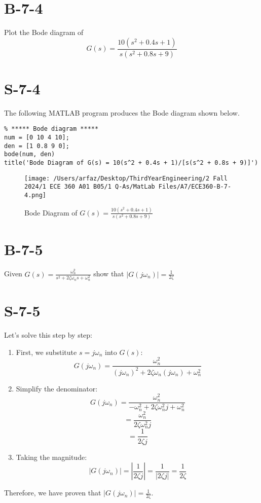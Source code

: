 \documentclass{article}
\begin{document}
\section*{B-7-4}
Plot the Bode diagram of 
\[
G(s) = \frac{10(s^2 + 0.4s + 1)}{s(s^2 + 0.8s + 9)}
\]

\section*{S-7-4}
The following MATLAB program produces the Bode diagram shown below.

\begin{mdframed}
{\color{solutionblue}
\begin{verbatim}
% ***** Bode diagram *****
num = [0 10 4 10];
den = [1 0.8 9 0];
bode(num, den)
title('Bode Diagram of G(s) = 10(s^2 + 0.4s + 1)/[s(s^2 + 0.8s + 9)]')
\end{verbatim}}
\end{mdframed}
\begin{figure}[H]
    \centering
    \texttt{[image: /Users/arfaz/Desktop/ThirdYearEngineering/2 Fall 2024/1 ECE 360 A01 B05/1 Q-As/MatLab Files/A7/ECE360-B-7-4.png]}
    \caption{Bode Diagram of \( G(s) = \frac{10(s^2 + 0.4s + 1)}{s(s^2 + 0.8s + 9)} \)}
\end{figure}

\section*{B-7-5}
Given
$ G(s) = \frac{\omega_n^2}{s^2 + 2\zeta\omega_n s + \omega_n^2} $
show that $ |G(j\omega_n)| = \frac{1}{2\zeta} $

\section*{S-7-5}
Let's solve this step by step:

\begin{enumerate}
    \item First, we substitute $s = j\omega_n$ into $G(s)$:
    \[
    G(j\omega_n) = \frac{\omega_n^2}{(j\omega_n)^2 + 2\zeta\omega_n(j\omega_n) + \omega_n^2}
    \]

    \item Simplify the denominator:
    \[
    G(j\omega_n) = \frac{\omega_n^2}{-\omega_n^2 + 2\zeta\omega_n^2j + \omega_n^2}
    \]
    \[
    = \frac{\omega_n^2}{2\zeta\omega_n^2j}
    \]
    \[
    = \frac{1}{2\zeta j}
    \]

    \item Taking the magnitude:
    \[
    |G(j\omega_n)| = \left|\frac{1}{2\zeta j}\right| = \frac{1}{|2\zeta j|} = \frac{1}{2\zeta}
    \]
\end{enumerate}
{\color{solutionblue} Therefore, we have proven that $|G(j\omega_n)| = \frac{1}{2\zeta}$}.
\end{document}
